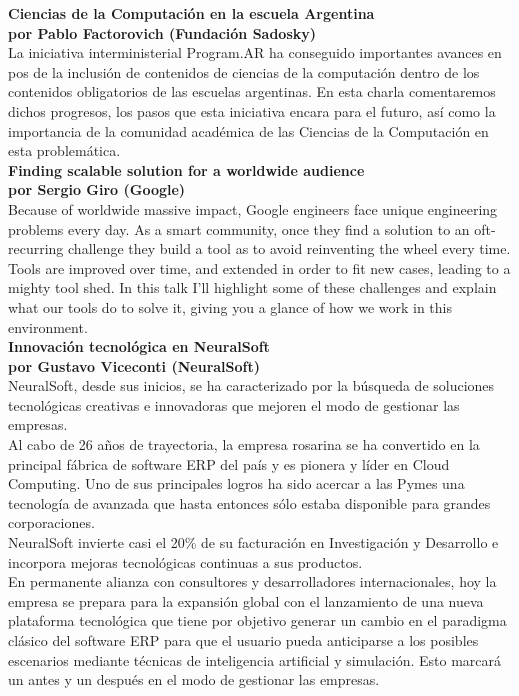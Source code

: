 \documentclass[12pt, a4paper]{article}
\newcommand{\charla}[3]{
	{\large\bf#1}\\
	{\bf por #2}\\
	#3\\
}
\begin{document}
\newpage

\charla
{Ciencias de la Computación en la escuela Argentina}
{Pablo Factorovich (Fundación Sadosky)}
{La iniciativa interministerial Program.AR ha conseguido importantes avances en pos de la inclusión de contenidos de ciencias de la computación dentro de los contenidos obligatorios de las escuelas argentinas. En esta charla comentaremos dichos progresos, los pasos que esta iniciativa encara para el futuro, así como la importancia de la comunidad académica de las Ciencias de la Computación en esta problemática.}

\charla
{Finding scalable solution for a worldwide audience}
{Sergio Giro (Google)}
{Because of worldwide massive impact, Google engineers face unique engineering problems every day. As a smart community, once they find a solution to an oft-recurring challenge they build a tool as to avoid reinventing the wheel every time. Tools are improved over time, and extended in order to fit new cases, leading to a mighty tool shed. In this talk I'll highlight some of these challenges and explain what our tools do to solve it, giving you a glance of how we work in this environment.}

\charla
{Innovación tecnológica en NeuralSoft}
{Gustavo Viceconti (NeuralSoft)}
{NeuralSoft, desde sus inicios, se ha caracterizado por la búsqueda de soluciones tecnológicas creativas e innovadoras que mejoren el modo de gestionar las empresas. \\
Al cabo de 26 años de trayectoria, la empresa rosarina se ha convertido en la principal fábrica de software ERP del país y es pionera y líder en Cloud Computing. Uno de sus principales logros ha sido acercar a las Pymes una tecnología de avanzada que hasta entonces sólo estaba disponible para grandes corporaciones. \\
NeuralSoft invierte casi el 20\% de su facturación en Investigación y Desarrollo e incorpora mejoras tecnológicas continuas a sus productos. \\
En permanente alianza con consultores y desarrolladores internacionales, hoy la empresa se prepara para la expansión global con el lanzamiento de una nueva plataforma tecnológica que tiene por objetivo generar un cambio en el paradigma clásico del software ERP para que el usuario pueda anticiparse a los posibles escenarios mediante técnicas de inteligencia artificial y simulación. Esto marcará un antes y un después en el modo de gestionar las empresas.}
\end{document}
